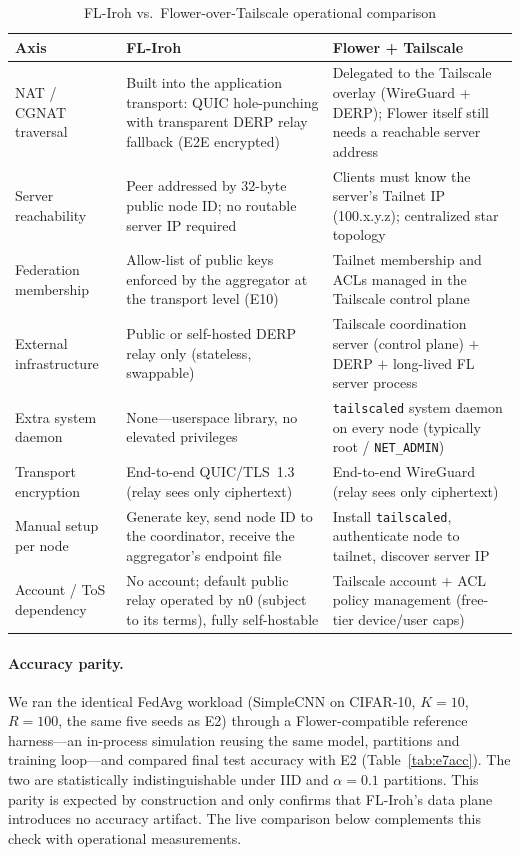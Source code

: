 \documentclass[a4paper,fleqn]{cas-dc}
\begin{document}
\begin{table}[t]
\centering
\caption{FL-Iroh vs.\ Flower-over-Tailscale operational comparison}
\label{tab:e7}
\footnotesize
\renewcommand{\arraystretch}{1.25}
\setlength{\tabcolsep}{4pt}
\begin{tabular}{p{2.4cm} p{6.2cm} p{6.2cm}}
\toprule
\textbf{Axis} & \textbf{FL-Iroh} & \textbf{Flower + Tailscale} \\
\midrule
NAT / CGNAT traversal & Built into the application transport: QUIC hole-punching with transparent DERP relay fallback (E2E encrypted) & Delegated to the Tailscale overlay (WireGuard + DERP); Flower itself still needs a reachable server address \\
Server reachability & Peer addressed by 32-byte public node ID; no routable server IP required & Clients must know the server's Tailnet IP (100.x.y.z); centralized star topology \\
Federation membership & Allow-list of public keys enforced by the aggregator at the transport level (E10) & Tailnet membership and ACLs managed in the Tailscale control plane \\
External infrastructure & Public or self-hosted DERP relay only (stateless, swappable) & Tailscale coordination server (control plane) $+$ DERP $+$ long-lived FL server process \\
Extra system daemon & None---userspace library, no elevated privileges & \texttt{tailscaled} system daemon on every node (typically root / \texttt{NET\_ADMIN}) \\
Transport encryption & End-to-end QUIC/TLS~1.3 (relay sees only ciphertext) & End-to-end WireGuard (relay sees only ciphertext) \\
Manual setup per node & Generate key, send node ID to the coordinator, receive the aggregator's endpoint file & Install \texttt{tailscaled}, authenticate node to tailnet, discover server IP \\
Account / ToS dependency & No account; default public relay operated by n0 (subject to its terms), fully self-hostable & Tailscale account $+$ ACL policy management (free-tier device/user caps) \\
\bottomrule
\end{tabular}
\end{table}

\paragraph{Accuracy parity.} We ran the identical FedAvg workload (SimpleCNN on CIFAR-10, $K{=}10$, $R{=}100$, the same five seeds as E2) through a Flower-compatible reference harness---an in-process simulation reusing the same model, partitions and training loop---and compared final test accuracy with E2 (Table~\ref{tab:e7acc}). The two are statistically indistinguishable under IID and $\alpha{=}0.1$ partitions. This parity is expected by construction and only confirms that FL-Iroh's data plane introduces no accuracy artifact. The live comparison below complements this check with operational measurements.
\end{document}

